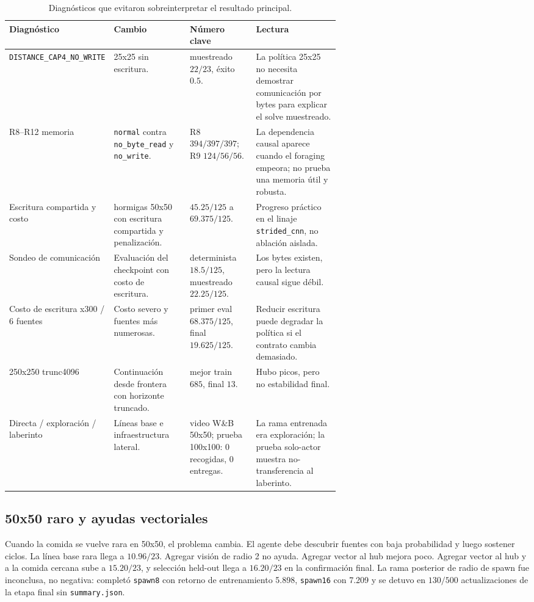 \documentclass[11pt,a4paper]{article}
\newcommand{\run}[1]{\nolinkurl{#1}}
\begin{document}
\begin{table}[h]
\centering
\footnotesize
\caption{Diagnósticos que evitaron sobreinterpretar el resultado principal.}
\begin{tabularx}{\linewidth}{>{\raggedright\arraybackslash}p{0.20\linewidth}>{\raggedright\arraybackslash}p{0.23\linewidth}>{\raggedright\arraybackslash}p{0.20\linewidth}X}
\toprule
Diagnóstico & Cambio & Número clave & Lectura \\
\midrule
\run{DISTANCE_CAP4_NO_WRITE} & 25x25 sin escritura. & muestreado \(22/23\), éxito \(0.5\). & La política 25x25 no necesita demostrar comunicación por bytes para explicar el solve muestreado. \\
R8--R12 memoria & \run{normal} contra \run{no_byte_read} y \run{no_write}. & R8 \(394/397/397\); R9 \(124/56/56\). & La dependencia causal aparece cuando el foraging empeora; no prueba una memoria útil y robusta. \\
Escritura compartida y costo & 8 hormigas 50x50 con escritura compartida y penalización. & \(45.25/125\) a \(69.375/125\). & Progreso práctico en el linaje \run{strided_cnn}, no ablación aislada. \\
Sondeo de comunicación & Evaluación del checkpoint con costo de escritura. & determinista \(18.5/125\), muestreado \(22.25/125\). & Los bytes existen, pero la lectura causal sigue débil. \\
Costo de escritura x300 / 6 fuentes & Costo severo y fuentes más numerosas. & primer eval \(68.375/125\), final \(19.625/125\). & Reducir escritura puede degradar la política si el contrato cambia demasiado. \\
250x250 trunc4096 & Continuación desde frontera con horizonte truncado. & mejor train \(685\), final \(13\). & Hubo picos, pero no estabilidad final. \\
Directa / exploración / laberinto & Líneas base e infraestructura lateral. & video W\&B 50x50; prueba 100x100: 0 recogidas, 0 entregas. & La rama entrenada era exploración; la prueba solo-actor muestra no-transferencia al laberinto. \\
\bottomrule
\end{tabularx}
\end{table}

\subsection{50x50 raro y ayudas vectoriales}

Cuando la comida se vuelve rara en 50x50, el problema cambia. El agente debe descubrir fuentes con baja probabilidad y luego sostener ciclos. La línea base rara llega a \(10.96/23\). Agregar visión de radio 2 no ayuda. Agregar vector al hub mejora poco. Agregar vector al hub y a la comida cercana sube a \(15.20/23\), y selección held-out llega a \(16.20/23\) en la confirmación final. La rama posterior de radio de spawn fue inconclusa, no negativa: completó \run{spawn8} con retorno de entrenamiento 5.898, \run{spawn16} con 7.209 y se detuvo en \(130/500\) actualizaciones de la etapa final sin \run{summary.json}.
\end{document}
